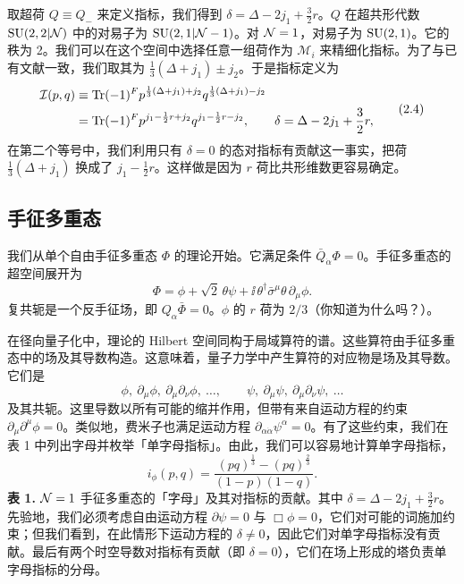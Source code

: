 取超荷 $Q\equiv Q_-$ 来定义指标，我们得到 $\delta=\Delta-2j_1+\frac32 r$。$Q$ 在超共形代数 $\operatorname{SU}(2,2|\mathcal{N})$ 中的对易子为 $\operatorname{SU}(2,1|\mathcal{N}-1)$。对 $\mathcal{N}=1$，对易子为 $\operatorname{SU}(2,1)$。它的秩为 2。我们可以在这个空间中选择任意一组荷作为 $\mathcal{M}_i$ 来精细化指标。为了与已有文献一致，我们取其为 $\frac13(\Delta+j_1)\pm j_2$。于是指标定义为
\[
\begin{aligned}
\mathcal{I}(p,q)&\equiv\operatorname{Tr}(-1)^F p^{\frac13(\Delta+j_1)+j_2}q^{\frac13(\Delta+j_1)-j_2}\\
&=\operatorname{Tr}(-1)^F p^{j_1-\frac12 r+j_2}q^{j_1-\frac12 r-j_2},\qquad \delta=\Delta-2j_1+\frac32 r ,
\end{aligned}
\tag{2.4}
\]
在第二个等号中，我们利用只有 $\delta=0$ 的态对指标有贡献这一事实，把荷 $\frac13(\Delta+j_1)$ 换成了 $j_1-\frac12 r$。这样做是因为 $r$ 荷比共形维数更容易确定。

\subsection{手征多重态}

我们从单个自由手征多重态 $\Phi$ 的理论开始。它满足条件 $\bar Q_{\dot\alpha}\Phi=0$。手征多重态的超空间展开为
\[
\Phi=\phi+\sqrt2\,\theta\psi+\ii\,\theta^\dagger\bar\sigma^\mu\theta\,\partial_\mu\phi .
\tag{2.5}
\]
复共轭是一个反手征场，即 $Q_\alpha\bar\Phi=0$。$\phi$ 的 $r$ 荷为 $2/3$（你知道为什么吗？）。

在径向量子化中，理论的 Hilbert 空间同构于局域算符的谱。这些算符由手征多重态中的场及其导数构造。这意味着，量子力学中产生算符的对应物是场及其导数。它们是
\[
\phi,\ \partial_\mu\phi,\ \partial_\mu\partial_\nu\phi,\ \ldots,\qquad
\psi,\ \partial_\mu\psi,\ \partial_\mu\partial_\nu\psi,\ \ldots
\tag{2.6}
\]
及其共轭。这里导数以所有可能的缩并作用，但带有来自运动方程的约束 $\partial_\mu\partial^\mu\phi=0$。类似地，费米子也满足运动方程 $\partial_{\alpha\dot\alpha}\psi^\alpha=0$。有了这些约束，我们在表 1 中列出字母并枚举「单字母指标」。由此，我们可以容易地计算单字母指标，
\[
i_\phi(p,q)=\frac{(pq)^{\frac13}-(pq)^{\frac23}}{(1-p)(1-q)} .
\tag{2.7}
\]
\noindent\textbf{表 1.} $\mathcal{N}=1$ 手征多重态的「字母」及其对指标的贡献。其中 $\delta=\Delta-2j_1+\frac32 r$。先验地，我们必须考虑自由运动方程 $\partial\psi=0$ 与 $\Box\phi=0$，它们对可能的词施加约束；但我们看到，在此情形下运动方程的 $\delta\neq0$，因此它们对单字母指标没有贡献。最后有两个时空导数对指标有贡献（即 $\delta=0$），它们在场上形成的塔负责单字母指标的分母。

